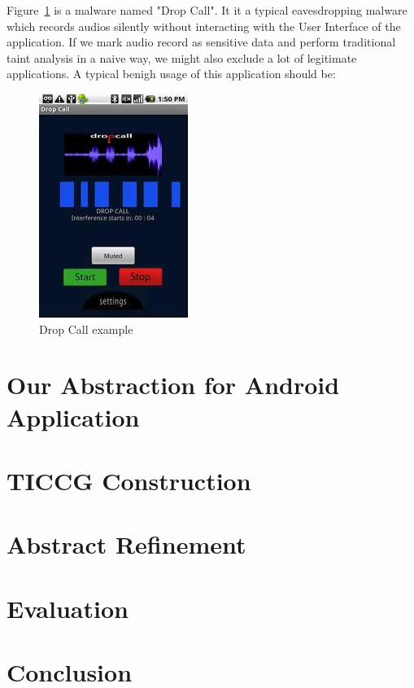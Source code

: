 \documentclass{article}
\begin{document}
Figure~\ref{dropcall} is a malware named "Drop Call". It it a typical 
eavesdropping malware which records audios silently without interacting with the
User Interface of the application. If we mark audio record as sensitive data 
and perform traditional taint analysis in a naive way, we might also 
exclude a lot of legitimate applications. A typical benigh usage of this 
application should be: 

\begin{figure}[ht!]
\centering
\includegraphics[scale=0.8]{dropped-call.jpg}
\caption{Drop Call example\label{dropcall}}
\end{figure}


\section{Our Abstraction for Android Application}
\label{sec:ticcg}

\section{TICCG Construction}
\label{sec:construct}

\section{Abstract Refinement}
\label{sec:cegar}

\section{Evaluation}
\label{sec:eval}

\section{Conclusion}
\label{sec:conclude}

%
%


 
\end{document}
